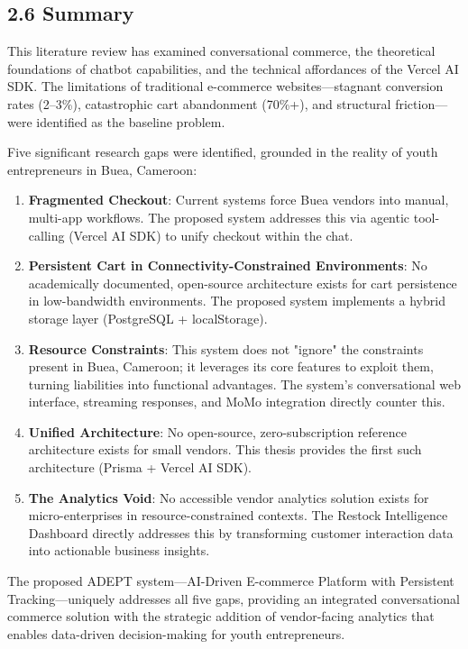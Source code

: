 \documentclass[12pt,a4paper]{article}
\begin{document}
\subsection{2.6 Summary}

This literature review has examined conversational commerce, the theoretical foundations of chatbot capabilities, and the technical affordances of the Vercel AI SDK. The limitations of traditional e-commerce websites---stagnant conversion rates (2--3\%), catastrophic cart abandonment (70\%+), and structural friction---were identified as the baseline problem.

Five significant research gaps were identified, grounded in the reality of youth entrepreneurs in Buea, Cameroon:

\begin{enumerate}
    \item \textbf{Fragmented Checkout}: Current systems force Buea vendors into manual, multi-app workflows. The proposed system addresses this via agentic tool-calling (Vercel AI SDK) to unify checkout within the chat.
    \item \textbf{Persistent Cart in Connectivity-Constrained Environments}: No academically documented, open-source architecture exists for cart persistence in low-bandwidth environments. The proposed system implements a hybrid storage layer (PostgreSQL + localStorage).
    \item \textbf{Resource Constraints}: This system does not "ignore" the constraints present in Buea, Cameroon; it leverages its core features to exploit them, turning liabilities into functional advantages. The system's conversational web interface, streaming responses, and MoMo integration directly counter this.
    \item \textbf{Unified Architecture}: No open-source, zero-subscription reference architecture exists for small vendors. This thesis provides the first such architecture (Prisma + Vercel AI SDK).
    \item \textbf{The Analytics Void}: No accessible vendor analytics solution exists for micro-enterprises in resource-constrained contexts. The Restock Intelligence Dashboard directly addresses this by transforming customer interaction data into actionable business insights.
\end{enumerate}

The proposed ADEPT system---AI-Driven E-commerce Platform with Persistent Tracking---uniquely addresses all five gaps, providing an integrated conversational commerce solution with the strategic addition of vendor-facing analytics that enables data-driven decision-making for youth entrepreneurs.
\end{document}
